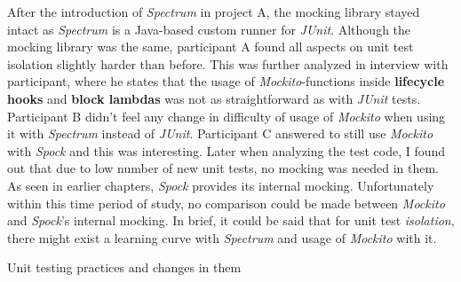 After the introduction of \textit{Spectrum} in project A, the mocking library stayed intact as \textit{Spectrum}
is a Java-based custom runner for \textit{JUnit}. Although the mocking library was the same, participant A
found all aspects on unit test isolation slightly harder than before. This was further analyzed in interview with participant,
where he states that the usage of \textit{Mockito}-functions inside \textbf{lifecycle hooks} and \textbf{block lambdas} was not
as straightforward as with \textit{JUnit} tests. Participant B didn't feel any change in difficulty of usage of \textit{Mockito}
when using it with \textit{Spectrum} instead of \textit{JUnit}. Participant C answered to still use \textit{Mockito} with \textit{Spock} and this
was interesting. Later when analyzing the test code, I found out that due to low number of new unit tests, no mocking
was needed in them. As seen in earlier chapters, \textit{Spock} provides its internal mocking. Unfortunately within this time
period of study, no comparison could be made between \textit{Mockito} and \textit{Spock}'s internal mocking. In brief, it could
be said that for unit test \textit{isolation}, there might exist a learning curve with \textit{Spectrum} and usage of \textit{Mockito} with it.


    \begin{table}[H]
            \caption {Unit testing practices and changes in them} \label{tab:changes-pt10}
    \end{table}

